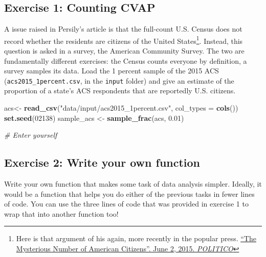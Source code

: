 \documentclass[]{book}
\newenvironment{Shaded}{\begin{snugshade}}{\end{snugshade}}
\newcommand{\CommentTok}[1]{\textcolor[rgb]{0.56,0.35,0.01}{\textit{#1}}}
\newcommand{\DataTypeTok}[1]{\textcolor[rgb]{0.13,0.29,0.53}{#1}}
\newcommand{\DecValTok}[1]{\textcolor[rgb]{0.00,0.00,0.81}{#1}}
\newcommand{\FloatTok}[1]{\textcolor[rgb]{0.00,0.00,0.81}{#1}}
\newcommand{\KeywordTok}[1]{\textcolor[rgb]{0.13,0.29,0.53}{\textbf{#1}}}
\newcommand{\NormalTok}[1]{#1}
\newcommand{\StringTok}[1]{\textcolor[rgb]{0.31,0.60,0.02}{#1}}
\let\rmarkdownfootnote\footnote%
\def\footnote{\protect\rmarkdownfootnote}
\theoremstyle{definition}
\theoremstyle{definition}
\theoremstyle{definition}
\theoremstyle{remark}
\begin{document}
\begin{Shaded}
\begin{Highlighting}[]
\begin{Shaded}
\begin{Highlighting}[]
\begin{Shaded}
\begin{Highlighting}[]
\hypertarget{exercise-1-counting-cvap}{%
\subsection*{Exercise 1: Counting CVAP}\label{exercise-1-counting-cvap}}

A issue raised in Persily's article is that the full-count U.S. Census does not record whether the residents are citizens of the United States\footnote{Here is that argument of his again, more recently in the popular press. \href{http://www.politico.com/magazine/story/2015/06/the-supreme-courts-big-data-problem-118568}{``The Mysterious Number of American Citizens''. June 2, 2015. \emph{POLITICO}}}. Instead, this question is asked in a survey, the American Community Survey. The two are fundamentally different exercises: the Census counts everyone by definition, a survey samples its data. Load the 1 percent sample of the 2015 ACS (\texttt{acs2015\_1percent.csv}, in the \texttt{input} folder) and give an estimate of the proportion of a state's ACS respondents that are reportedly U.S. citizens.

\begin{Shaded}
\begin{Highlighting}[]
\NormalTok{acs<-}\StringTok{ }\KeywordTok{read_csv}\NormalTok{(}\StringTok{"data/input/acs2015_1percent.csv"}\NormalTok{, }\DataTypeTok{col_types =} \KeywordTok{cols}\NormalTok{())}
\KeywordTok{set.seed}\NormalTok{(}\DecValTok{02138}\NormalTok{)}
\NormalTok{sample_acs <-}\StringTok{ }\KeywordTok{sample_frac}\NormalTok{(acs, }\FloatTok{0.01}\NormalTok{)}

\CommentTok{# Enter yourself}
\end{Highlighting}
\end{Shaded}

\hypertarget{exercise-2-write-your-own-function}{%
\subsection*{Exercise 2: Write your own function}\label{exercise-2-write-your-own-function}}

Write your own function that makes some task of data analysis simpler. Ideally, it would be a function that helps you do either of the previous tasks in fewer lines of code. You can use the three lines of code that was provided in exercise 1 to wrap that into another function too!


\end{Highlighting}
\end{Shaded}
\end{Highlighting}
\end{Shaded}
\end{Highlighting}
\end{Shaded}
\end{document}
